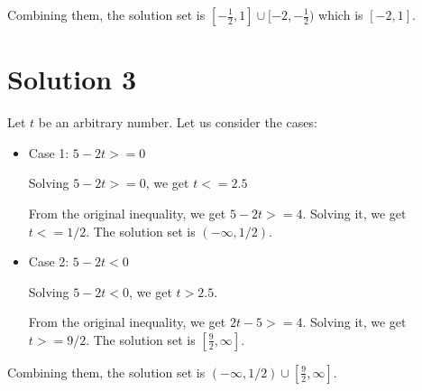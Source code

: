 \documentclass{article}
\begin{document}
Combining them, the solution set is
$[-\frac{1}{2}, 1] \cup [-2, -\frac{1}{2})$ which is $[-2, 1]$.

\section{Solution 3}

Let $t$ be an arbitrary number. Let us consider the cases:

\begin{itemize}
\item Case 1: $5 - 2t >= 0$

  Solving $5 - 2t >= 0$, we get $t <= 2.5$

  From the original inequality, we get $5 - 2t >= 4$. Solving it, we
  get $t <= 1/2$. The solution set is $(-\infty, 1/2)$.

\item Case 2: $5 - 2t < 0$

  Solving $5 - 2t < 0$, we get $t > 2.5$.

  From the original inequality, we get $2t - 5 >= 4$. Solving it, we
  get $t >= 9/2$. The solution set is $[\frac{9}{2}, \infty]$.
\end{itemize}


Combining them, the solution set is $(-\infty, 1/2) \cup [\frac{9}{2},
  \infty]$.
\end{document}
